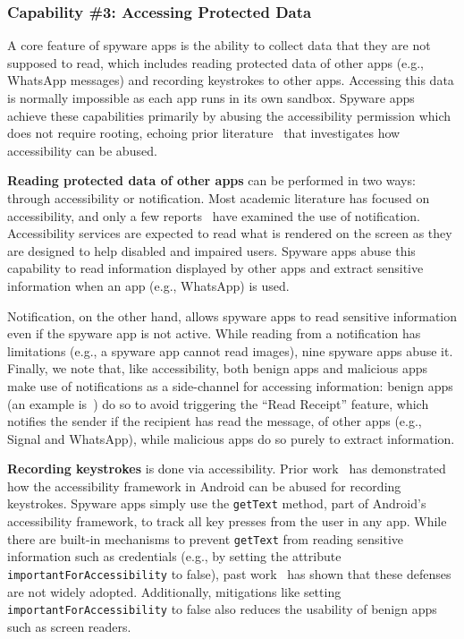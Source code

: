 \subsubsection*{Capability \#3: Accessing Protected Data}
A core feature of spyware apps is the ability to collect data that they
are not supposed to read, which includes reading protected data of other apps (e.g.,
WhatsApp messages) and recording keystrokes to other apps. Accessing this data is normally
impossible as each app runs in its own sandbox. Spyware apps achieve these
capabilities primarily by abusing the accessibility permission which does not
require rooting, echoing prior literature~\cite{fratantonio2017cloak,
kraunelis2013malware, jang2014a11y, diao2019kindness, kalysch2018android,
huang2021a11y, naseri2019accessileaks} that investigates how accessibility can
be abused.

\textbf{Reading protected data of other apps} can be performed in two ways: through
accessibility or notification. Most academic literature has focused on
accessibility, and only a few reports~\cite{VB2019Za6:online} have examined the
use of notification. Accessibility services are expected to read what is
rendered on the screen as they are designed to help disabled and impaired users.
Spyware apps abuse this capability to read information displayed by other apps
and extract sensitive information when an app (e.g., WhatsApp) is used.

Notification, on the other hand, allows spyware apps to read sensitive
information even if the spyware app is not active. While reading from a notification has
limitations (e.g., a spyware app cannot read images), nine spyware apps abuse it.
Finally, we note that, like accessibility, both benign apps and malicious apps
make use of notifications as a side-channel for accessing information: benign
apps (an example is~\cite{ReadUnre55:online}) do so to avoid triggering the ``Read Receipt'' feature, which notifies the
sender if the recipient has read the message,
of other apps (e.g., Signal and WhatsApp), while malicious apps do so
purely to extract information.

\textbf{Recording keystrokes} is done via accessibility. Prior
work~\cite{fratantonio2017cloak,jang2014a11y,naseri2019accessileaks} has
demonstrated how the accessibility framework in Android can be abused for
recording keystrokes.
Spyware apps simply use the \texttt{getText} method, part
of Android's accessibility framework, to track all key presses from the user in
any app.
While there are built-in mechanisms to prevent \texttt{getText} from
reading sensitive information such as credentials (e.g., by setting
the attribute
\texttt{importantForAccessibility} to false), past
work~\cite{naseri2019accessileaks} has shown that these defenses are not
widely adopted. Additionally, mitigations like setting \texttt{importantForAccessibility} to
false also reduces the usability of benign apps such as screen readers.

